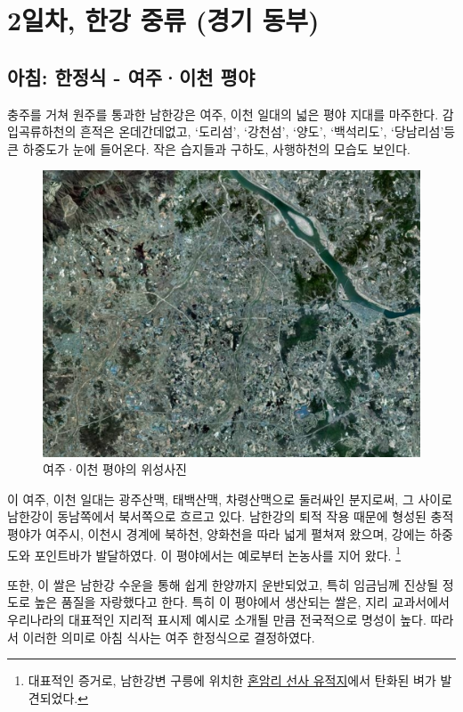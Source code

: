 \chapter{2일차, 한강 중류 (경기 동부)}
\section{아침: 한정식 - 여주·이천 평야}
충주를 거쳐 원주를 통과한 남한강은 여주, 이천 일대의 넓은 평야 지대를 마주한다. 
감입곡류하천의 흔적은 온데간데없고, `도리섬', `강천섬', ‘양도’, ‘백석리도’, `당남리섬'등 큰 하중도가 눈에 들어온다.
작은 습지들과 구하도, 사행하천의 모습도 보인다.

\begin{figure}[ht]
    \centering
    \includegraphics[width=.6\textwidth]{img/여주이천평야.jpg}
    \caption{여주·이천 평야의 위성사진\protect\footnotemark}
    \label{fig:my_label}
\end{figure}


이 여주, 이천 일대는 
광주산맥, 태백산맥, 차령산맥으로 둘러싸인 분지로써,
그 사이로 남한강이 동남쪽에서 북서쪽으로 흐르고 있다.
남한강의 퇴적 작용 때문에 형성된 충적평야가 여주시, 이천시 경계에 북하천, 양화천을 따라 넓게 펼쳐져 왔으며,
강에는 하중도와 포인트바가 발달하였다.
이 평야에서는 예로부터 논농사를 지어 왔다.
\footnote{대표적인 증거로, 남한강변 구릉에 위치한 \href{https://terms.naver.com/entry.naver?docId=1793906&cid=49217&categoryId=49217}{혼암리 선사 유적지}에서 탄화된 벼가 발견되었다.}


또한, 이 쌀은 남한강 수운을 통해 쉽게 한양까지 운반되었고, 특히 임금님께 진상될 정도로 높은 품질을 자랑했다고 한다.
특히 이 평야에서 생산되는 쌀은, 지리 교과서에서 우리나라의 대표적인 지리적 표시제 예시로 소개될 만큼 전국적으로 명성이 높다.
따라서 이러한 의미로 아침 식사는 여주 한정식으로 결정하였다.
 


